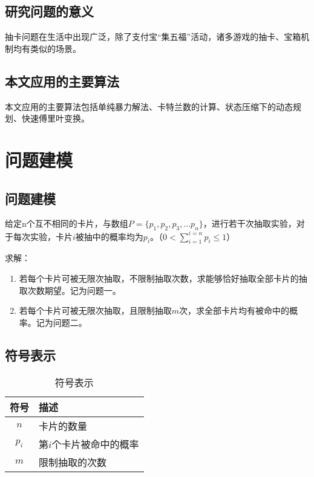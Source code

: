 \documentclass[master]{thesis-uestc}
\begin{document}
\section{研究问题的意义}

抽卡问题在生活中出现广泛，除了支付宝“集五福”活动，诸多游戏的抽卡、宝箱机制均有类似的场景。

\section{本文应用的主要算法}

本文应用的主要算法包括单纯暴力解法、卡特兰数的计算、状态压缩下的动态规划、快速傅里叶变换。


\chapter{问题建模}

\section{问题建模}

给定n个互不相同的卡片，与数组$P=\{p_1,p_2,p_3,...p_n\}$，进行若干次抽取实验，对于每次实验，卡片$i$被抽中的概率均为$p_i$。（$0< \sum\limits_{i=1}^{i=n}{p_i}\leq 1$）
\vspace{0.5cm}

求解：

\begin{enumerate}
\item 若每个卡片可被无限次抽取，不限制抽取次数，求能够恰好抽取全部卡片的抽取次数期望。记为问题一。
\item 若每个卡片可被无限次抽取，且限制抽取$m$次，求全部卡片均有被命中的概率。记为问题二。
\end{enumerate}



\section{符号表示}
\begin{table}[!htbp]
    \centering
    \begin{tabular}{c l}
        \hline
        符号 & 描述 \\
        \hline \hline
        $n$ & 卡片的数量\\
        \hline
        $p_i$ & 第$i$个卡片被命中的概率\\
        \hline
        $m$ & 限制抽取的次数\\
        \hline

    \end{tabular}
    \caption*{符号表示}
    \label{tab:my_label1}
\end{table}
\end{document}
